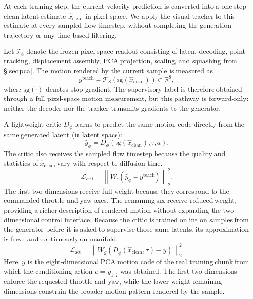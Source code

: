 \documentclass[letterpaper]{article} %
\begin{document}
At each training step, the current velocity prediction is converted into a
one step clean latent estimate $\hat{x}_{\mathrm{clean}}$ in pixel space. We apply the visual teacher to this estimate at every sampled flow timestep, without
completing the generation trajectory or any time based filtering.

Let $\mathcal{T}_8$ denote the frozen pixel-space readout consisting of
latent decoding, point tracking, displacement assembly, PCA projection,
scaling, and squashing from \S\ref{sec:pca}. The motion rendered by the
current sample is measured as
\begin{equation}
    y^{\mathrm{teach}}
    =
    \mathcal{T}_8
    \left(
        \mathrm{sg}(\hat{x}_{\mathrm{clean}})
    \right)
    \in\mathbb{R}^{8},
    \label{eq:teacher_readout}
\end{equation}
where $\mathrm{sg}(\cdot)$ denotes stop-gradient. The supervisory label is
therefore obtained through a full pixel-space motion measurement, but this
pathway is forward-only: neither the decoder nor the tracker transmits
gradients to the generator.

A lightweight critic $D_\phi$ learns to predict the same motion code directly
from the same generated latent (in latent space):
\begin{equation}
    \hat y_\phi
    =
    D_\phi
    \left(
        \mathrm{sg}(\hat{x}_{\mathrm{clean}}),\tau,a
    \right).
    \label{eq:critic_prediction}
\end{equation}
The critic also receives the sampled flow timestep because the quality and
statistics of $\hat{x}_{\mathrm{clean}}$ vary with respect to diffusion time.
\begin{equation}
    \mathcal{L}_{\mathrm{crit}}
    =
    \left\|
        W_c
        \left(
            \hat y_\phi-y^{\mathrm{teach}}
        \right)
    \right\|_2^2.
    \label{eq:critic_loss}
\end{equation}
The first two dimensions receive full weight because they correspond to the
commanded throttle and yaw axes. The remaining six receive reduced weight,
providing a richer description of rendered motion without expanding the
two-dimensional control interface. Because the critic
is trained online on samples from the generator before it is asked to supervise those same latents, its approximation is fresh and continuously on manifold.
\begin{equation}
    \mathcal{L}_{\mathrm{act}}
    =
    \left\|
        W_g
        \left(
            D_{\bar\phi}(\hat{x}_{\mathrm{clean}},\tau)
            -
            y
        \right)
    \right\|_2^2.
    \label{eq:latent_action_loss}
\end{equation}
Here, $y$ is the eight-dimensional PCA motion code of the real training
chunk from which the conditioning action $a=y_{1:2}$ was obtained. The first
two dimensions enforce the requested throttle and yaw, while the lower-weight
remaining dimensions constrain the broader motion pattern rendered by the
sample.
\end{document}
